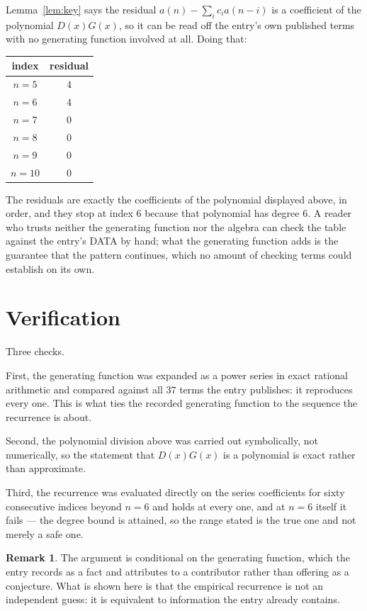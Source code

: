 \documentclass[11pt,a4paper]{article}
\theoremstyle{plain}
\theoremstyle{definition}
\newtheorem{remark}[theorem]{Remark}
\begin{document}
Lemma~\ref{lem:key} says the residual $a(n)-\sum_ic_ia(n-i)$ is a coefficient of the
polynomial $D(x)G(x)$, so it can be read off the entry's own published terms with no
generating function involved at all. Doing that:
\begin{center}
\begin{tabular}{cc}
index & residual \\ \hline
$n=5$ & $4$ \\
$n=6$ & $4$ \\
$n=7$ & $0$ \\
$n=8$ & $0$ \\
$n=9$ & $0$ \\
$n=10$ & $0$
\end{tabular}
\end{center}
The residuals are exactly the coefficients of the polynomial displayed above, in order, and
they stop at index $6$ because that polynomial has degree $6$. A reader who trusts
neither the generating function nor the algebra can check the table against the entry's DATA
by hand; what the generating function adds is the guarantee that the pattern continues, which
no amount of checking terms could establish on its own.

\section{Verification}

Three checks.

First, the generating function was expanded as a power series in exact rational arithmetic and
compared against all $37$ terms the entry publishes: it reproduces every one. This is
what ties the recorded generating function to the sequence the recurrence is about.

Second, the polynomial division above was carried out symbolically, not numerically, so the
statement that $D(x)G(x)$ is a polynomial is exact rather than approximate.

Third, the recurrence was evaluated directly on the series coefficients for sixty consecutive
indices beyond $n=6$ and holds at every one, and at $n=6$ itself it fails --- the
degree bound is attained, so the range stated is the true one and not merely a safe one.

\begin{remark}
The argument is conditional on the generating function, which the entry records as a fact and
attributes to a contributor rather than offering as a conjecture. What is shown here is that
the empirical recurrence is not an independent guess: it is equivalent to information the
entry already contains.
\end{remark}
\end{document}
